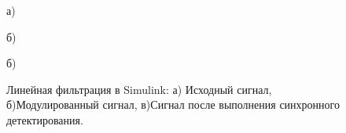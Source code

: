 \documentclass[10pt,a4paper]{article}
\begin{document}
\begin{figure}[H]
\begin{minipage}[h]{0.8\linewidth}
 а)\\
\end{minipage}
\vfill
\begin{minipage}[h]{0.8\linewidth}
 б) \\
\end{minipage}
\vfill
\begin{minipage}[h]{0.8\linewidth}
 б) \\
\end{minipage}
\vfill
\caption{Линейная фильтрация в Simulink: а)
Исходный сигнал, б)Модулированный сигнал, в)Сигнал после выполнения синхронного детектирования.}
\label{ris:experimentalcorrelationsignals}
\end{figure}
\end{document}
